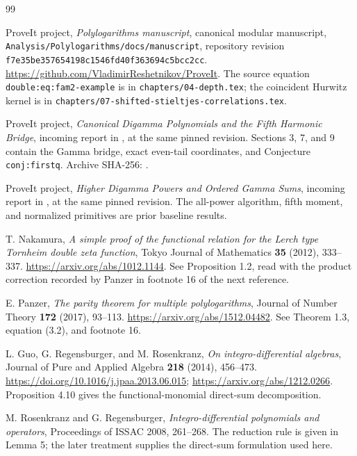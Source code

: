 \begin{thebibliography}{99}
\raggedright

ProveIt project,
\emph{Polylogarithms manuscript}, canonical modular manuscript,
\texttt{Analysis/Polylogarithms/docs/manuscript},
repository revision
\texttt{f7e35be357654198c1546fd40f363694c5bcc2cc}.
\url{https://github.com/VladimirReshetnikov/ProveIt}.
The source equation \texttt{double:eq:fam2-example} is in
\texttt{chapters/04-depth.tex}; the coincident Hurwitz kernel is in
\texttt{chapters/07-shifted-stieltjes-correlations.tex}.

ProveIt project,
\emph{Canonical Digamma Polynomials and the Fifth Harmonic Bridge},
incoming report in
,
at the same pinned revision.
Sections 3, 7, and 9 contain the Gamma bridge, exact even-tail
coordinates, and Conjecture \texttt{conj:firstq}.
Archive SHA-256:
.

ProveIt project,
\emph{Higher Digamma Powers and Ordered Gamma Sums},
incoming report in
,
at the same pinned revision.
The all-power algorithm, fifth moment, and normalized primitives are
prior baseline results.

T. Nakamura,
\emph{A simple proof of the functional relation for the Lerch type
Tornheim double zeta function},
Tokyo Journal of Mathematics \textbf{35} (2012), 333--337.
\url{https://arxiv.org/abs/1012.1144}.
See Proposition 1.2, read with the product correction recorded by
Panzer in footnote 16 of the next reference.

E. Panzer,
\emph{The parity theorem for multiple polylogarithms},
Journal of Number Theory \textbf{172} (2017), 93--113.
\url{https://arxiv.org/abs/1512.04482}.
See Theorem 1.3, equation (3.2), and footnote 16.

L. Guo, G. Regensburger, and M. Rosenkranz,
\emph{On integro-differential algebras},
Journal of Pure and Applied Algebra \textbf{218} (2014), 456--473.
\url{https://doi.org/10.1016/j.jpaa.2013.06.015};
\url{https://arxiv.org/abs/1212.0266}.
Proposition 4.10 gives the functional-monomial direct-sum decomposition.

M. Rosenkranz and G. Regensburger,
\emph{Integro-differential polynomials and operators},
Proceedings of ISSAC 2008, 261--268.
The reduction rule is given in Lemma 5; the later treatment
\cite{Guo2014} supplies the direct-sum formulation used here.


\end{thebibliography}
